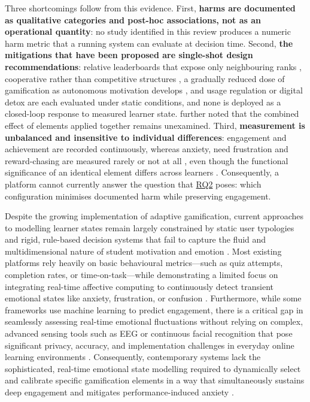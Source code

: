 \documentclass[12pt,a4paper]{article}
\DeclareRobustCommand{\rqlink}[1]{\texorpdfstring{\hyperref[rq:rq#1]{RQ#1}}{RQ#1}}
\begin{document}
\begin{justify}
Three shortcomings follow from this evidence. First, \textbf{harms are documented as qualitative categories and post-hoc associations, not as an operational quantity}: no study identified in this review produces a numeric harm metric that a running system can evaluate at decision time. Second, \textbf{the mitigations that have been proposed are single-shot design recommendations}: relative leaderboards that expose only neighbouring ranks \parencite{nugroho2025negative}, cooperative rather than competitive structures \parencite{edwards2022anxiety}, a gradually reduced dose of gamification as autonomous motivation develops \parencite{gao2024sdt}, and usage regulation or digital detox \parencite{gul2026brainrot} are each evaluated under static conditions, and none is deployed as a closed-loop response to measured learner state. \textcite{nugroho2025negative} further noted that the combined effect of elements applied together remains unexamined. Third, \textbf{measurement is unbalanced and insensitive to individual differences}: engagement and achievement are recorded continuously, whereas anxiety, need frustration and reward-chasing are measured rarely or not at all \parencite{edwards2022anxiety}, even though the functional significance of an identical element differs across learners \parencite{gao2024sdt}. Consequently, a platform cannot currently answer the question that \rqlink{2} poses: which configuration minimises documented harm while preserving engagement.

Despite the growing implementation of adaptive gamification, current approaches to modelling learner states remain largely constrained 
by static user typologies and rigid, rule-based decision systems that fail to capture the fluid and multidimensional nature 
of student motivation and emotion \parencite{shabadurai2025reinforcement,zourmpakis2023adaptive}. Most existing platforms 
rely heavily on basic behavioural metrics—such as quiz attempts, completion rates, or time-on-task—while demonstrating a 
limited focus on integrating real-time affective computing to continuously detect transient emotional states like anxiety, 
frustration, or confusion \parencite{naseer2025game}. Furthermore, while some frameworks use machine learning to predict 
engagement, there is a critical gap in seamlessly assessing real-time emotional fluctuations without relying on complex, 
advanced sensing tools such as EEG or continuous facial recognition that pose significant privacy, accuracy, and implementation 
challenges in everyday online learning environments \parencite{farhan2023machine,vistorte2024integrating}. Consequently, 
contemporary systems lack the sophisticated, real-time emotional state modelling required to dynamically select and calibrate 
specific gamification elements in a way that simultaneously sustains deep engagement and mitigates performance-induced anxiety 
\parencite{naseer2025game,zourmpakis2023adaptive}.


\end{justify}
\end{document}
